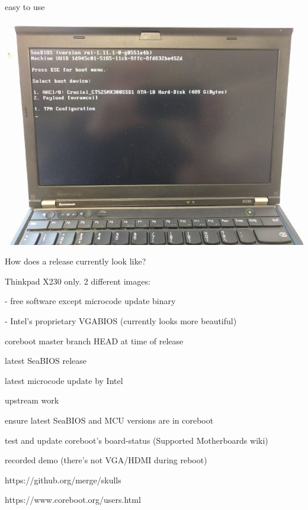 \documentclass[14pt]{beamer}
\begin{document}
\begin{frame}
easy to use
\end{frame}


\begin{frame}

\includegraphics[width=\textwidth]{seabios}

\end{frame}


\begin{frame}
How does a release currently look like?
\end{frame}


\begin{frame}
Thinkpad X230 only. 2 different images:

- free software except microcode update binary

- Intel's proprietary VGABIOS (currently looks more beautiful)
\pause

coreboot master branch HEAD at time of release

latest SeaBIOS release

latest microcode update by Intel
\end{frame}


\begin{frame}
upstream work
\end{frame}


\begin{frame}
ensure latest SeaBIOS and MCU versions are in coreboot

test and update coreboot's board-status (Supported Motherboards wiki)
\end{frame}


\begin{frame}
recorded demo (there's not VGA/HDMI during reboot)
\end{frame}

\begin{frame}
https://github.org/merge/skulls

https://www.coreboot.org/users.html
\end{frame}
\end{document}
